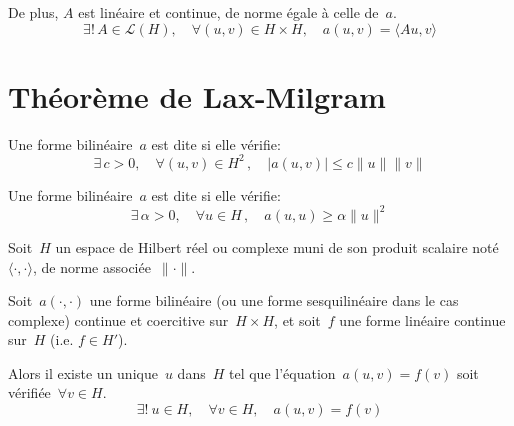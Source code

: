 De plus, $A$ est linéaire et continue, de norme égale à celle de~$a$.
\begin{equation}
\exists !\,A\in \mathcal{L}(H),\quad \forall (u,v)\in H\times H,\quad a(u,v)=\langle Au,v \rangle
\end{equation}

\medskip
\section{Théorème de Lax-Milgram}\label{Sec-ThLaxMilgram}\label{Sec:LaxMil}

\medskip
\begin{definition}
Une forme bilinéaire~$a$ est dite  si elle vérifie:
\begin{equation}
\exists\,c>0,\quad \forall (u,v)\in H^2\,,\quad |a(u,v)|\leq c\|u\|\|v\|
\end{equation}
\end{definition}

\medskip
\begin{definition}
Une forme bilinéaire~$a$ est dite  si elle vérifie:
\begin{equation}
\exists\,\alpha>0,\quad \forall u\in H\,,\quad a(u,u) \geq \alpha\|u\|^2
\end{equation}
\end{definition}

\medskip
\begin{theoreme}
Soit~$H$ un espace de Hilbert réel ou complexe muni de son produit scalaire noté $\langle\cdot,\cdot\rangle$, de norme associée~$\|\cdot\|$.

Soit~$a(\cdot,\cdot)$ une forme bilinéaire (ou une forme sesquilinéaire dans le cas complexe) continue et coercitive sur~$H\times H$, et soit~$f$ une forme linéaire continue sur~$H$ (i.e. $f\in H'$).

Alors il existe un unique~$u$ dans~$H$ tel que l'équation~$a(u,v) = f(v)$ soit vérifiée~$\forall v \in H$.
\begin{equation}
  \exists!\ u \in H,\quad \forall v\in H,\quad a(u,v)=f(v)
\end{equation}
\end{theoreme}

